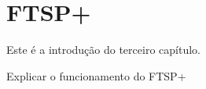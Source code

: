 \chapter{FTSP+} \label{cap:cap3}


Este \'e a introdu\c{c}\~ao do terceiro cap\'itulo. 

Explicar o funcionamento do FTSP+
